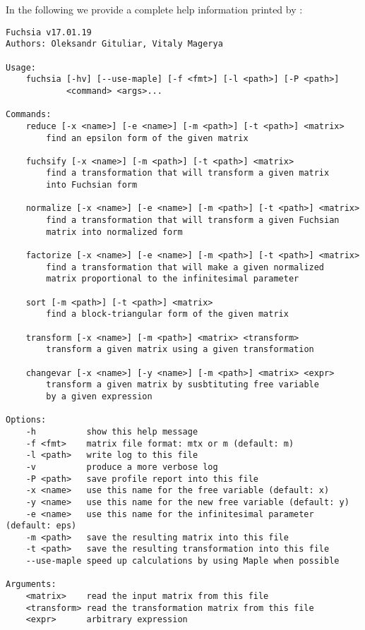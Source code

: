 \documentclass[12pt,a4paper]{article}
\begin{document}
In the following we provide a complete help information printed by :
\begin{Verbatim}
Fuchsia v17.01.19
Authors: Oleksandr Gituliar, Vitaly Magerya

Usage:
    fuchsia [-hv] [--use-maple] [-f <fmt>] [-l <path>] [-P <path>]
            <command> <args>...

Commands:
    reduce [-x <name>] [-e <name>] [-m <path>] [-t <path>] <matrix>
        find an epsilon form of the given matrix

    fuchsify [-x <name>] [-m <path>] [-t <path>] <matrix>
        find a transformation that will transform a given matrix
        into Fuchsian form

    normalize [-x <name>] [-e <name>] [-m <path>] [-t <path>] <matrix>
        find a transformation that will transform a given Fuchsian
        matrix into normalized form

    factorize [-x <name>] [-e <name>] [-m <path>] [-t <path>] <matrix>
        find a transformation that will make a given normalized
        matrix proportional to the infinitesimal parameter

    sort [-m <path>] [-t <path>] <matrix>
        find a block-triangular form of the given matrix

    transform [-x <name>] [-m <path>] <matrix> <transform>
        transform a given matrix using a given transformation

    changevar [-x <name>] [-y <name>] [-m <path>] <matrix> <expr>
        transform a given matrix by susbtituting free variable
        by a given expression

Options:
    -h          show this help message
    -f <fmt>    matrix file format: mtx or m (default: m)
    -l <path>   write log to this file
    -v          produce a more verbose log
    -P <path>   save profile report into this file
    -x <name>   use this name for the free variable (default: x)
    -y <name>   use this name for the new free variable (default: y)
    -e <name>   use this name for the infinitesimal parameter (default: eps)
    -m <path>   save the resulting matrix into this file
    -t <path>   save the resulting transformation into this file
    --use-maple speed up calculations by using Maple when possible

Arguments:
    <matrix>    read the input matrix from this file
    <transform> read the transformation matrix from this file
    <expr>      arbitrary expression
\end{Verbatim}
\end{document}
